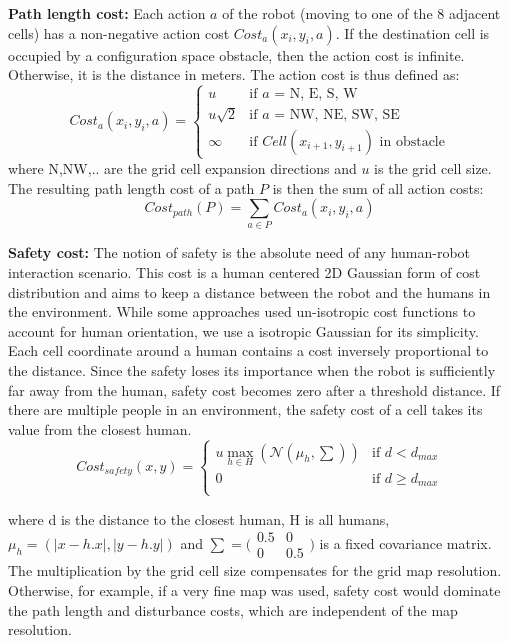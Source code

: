 \documentclass[12pt]{gatech-thesis}
\begin{document}
\textbf{Path length cost:}  Each action $a$ of the robot (moving to one of the 8 adjacent cells) has a non-negative action cost $Cost_{a}(x_{i},y_{i},a)$. If the destination cell is occupied by a configuration space obstacle, then the action cost is infinite. Otherwise, it is the distance in meters. The action cost is thus defined as:
\[
Cost_{a}(x_{i},y_{i},a)=\left\{ \begin{array}{cl}
u & \textrm{if $a$ = N, E, S, W}\\
u\sqrt{2} & \textrm{if $a$ = NW, NE, SW, SE}\\
\infty & \textrm{if  $Cell(x_{i+1}, y_{i+1})$ in obstacle} \end{array}\right.
\]
where N,NW,.. are the grid cell expansion directions and $u$ is the grid cell size. The resulting path length cost of a path $P$ is then the sum of all action costs: 
\[
Cost_{path}(P) = \sum\limits_{a \in P} Cost_{a}(x_{i},y_{i},a)
\]

\textbf{Safety cost:} The notion of safety is the absolute need of any human-robot interaction scenario. This cost is a human centered 2D Gaussian form of cost distribution and aims to keep a distance between the robot and the humans in the environment. While some approaches used un-isotropic cost functions to account for human orientation, we use a isotropic Gaussian for its simplicity. Each cell coordinate around a human contains a cost inversely proportional to the distance. Since the safety loses its importance when the robot is sufficiently far away from the human, safety cost becomes zero after a threshold distance. If there are multiple people in an environment, the safety cost of a cell takes its value from the closest human.
\[
Cost_{safety}(x,y)=\left\{ \begin{array}{cl}
u\max_{h\in H}(\mathcal{N}(\mu_h,\sum)) & \textrm{if $d<d_{max}$}\\
0 & \textrm{if $d\geq d_{max}$}\\
\end{array}\right.
\]

where d is the distance to the closest human, H is all humans, $\mu_h = (|x - h.x|,|y - h.y|)$ and $\sum = \bigl(\begin{smallmatrix}
0.5&0\\ 0&0.5
\end{smallmatrix} \bigr)$ is a fixed covariance matrix. The multiplication by the grid cell size compensates for the grid map resolution. Otherwise, for example, if a very fine map was used, safety cost would dominate the path length and disturbance costs, which are independent of the map resolution.
 
\end{document}
